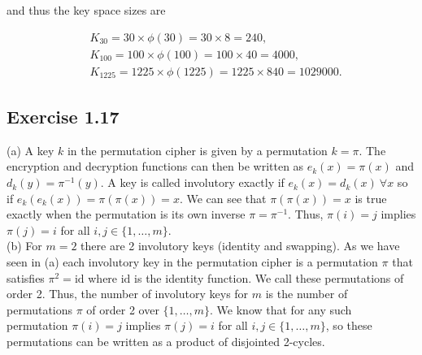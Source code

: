\documentclass[12pt]{article}
\begin{document}
\noindent and thus the key space sizes are

\begin{align*}
& K_{30} = 30 \times \phi(30) = 30 \times 8 = 240,\\
& K_{100} = 100 \times \phi(100) = 100 \times 40 = 4000,\\
& K_{1225} = 1225 \times \phi(1225) = 1225 \times 840 = 1029000.
\end{align*}

\subsection*{Exercise 1.17}

(a) A key $k$ in the permutation cipher is given by a permutation $k = \pi$. The encryption and decryption functions can then be written as $e_k(x) = \pi(x)$ and $d_k(y) = \pi^{-1}(y)$. A key is called involutory exactly if $e_k(x) = d_k(x) \ \forall x$ so if $e_k(e_k(x)) = \pi(\pi(x)) = x$. We can see that $\pi(\pi(x)) = x$ is true exactly when the permutation is its own inverse $\pi = \pi^{-1}$. Thus, $\pi(i) = j$ implies $\pi(j) = i$ for all $i,j \in \{1,\ldots,m\}$.\\



\noindent (b) For $m = 2$ there are 2 involutory keys (identity and swapping). As we have seen in (a) each involutory key in the permutation cipher is a permutation $\pi$ that satisfies $\pi^2 = \text{id}$ where $\text{id}$ is the identity function. We call these permutations of order 2. Thus, the number of involutory keys for $m$ is the number of permutations $\pi$ of order 2 over $\{1,\ldots,m\}$. We know that for any such permutation $\pi(i) = j$ implies $\pi(j) = i$ for all $i,j \in \{1,\ldots,m\}$, so these permutations can be written as a product of disjointed 2-cycles.
\end{document}

